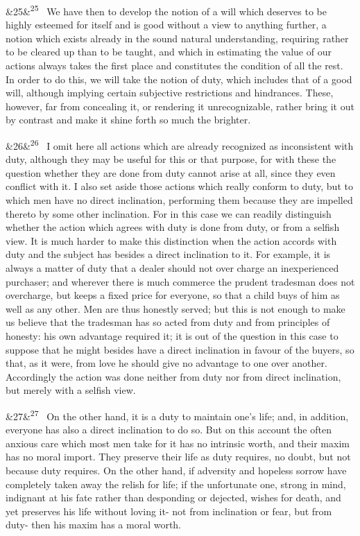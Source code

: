 \documentclass[12pt]{article}
\newcommand{\para}[1][]{\par\noindent\ifx&#1&\else\textsuperscript{\footnotesize #1}~\fi}
\begin{document}
\para[25] We have then to develop the notion of a will which deserves to be highly esteemed for itself and is good without a view to anything further, a notion which exists already in the sound natural understanding, requiring rather to be cleared up than to be taught, and which in estimating the value of our actions always takes the first place and constitutes the condition of all the rest. In order to do this, we will take the notion of duty, which includes that of a good will, although implying certain subjective restrictions and hindrances. These, however, far from concealing it, or rendering it unrecognizable, rather bring it out by contrast and make it shine forth so much the brighter.

\para[26] I omit here all actions which are already recognized as inconsistent with duty, although they may be useful for this or that purpose, for with these the question whether they are done from duty cannot arise at all, since they even conflict with it. I also set aside those actions which really conform to duty, but to which men have no direct inclination, performing them because they are impelled thereto by some other inclination. For in this case we can readily distinguish whether the action which agrees with duty is done from duty, or from a selfish view. It is much harder to make this distinction when the action accords with duty and the subject has besides a direct inclination to it. For example, it is always a matter of duty that a dealer should not over charge an inexperienced purchaser; and wherever there is much commerce the prudent tradesman does not overcharge, but keeps a fixed price for everyone, so that a child buys of him as well as any other. Men are thus honestly served; but this is not enough to make us believe that the tradesman has so acted from duty and from principles of honesty: his own advantage required it; it is out of the question in this case to suppose that he might besides have a direct inclination in favour of the buyers, so that, as it were, from love he should give no advantage to one over another. Accordingly the action was done neither from duty nor from direct inclination, but merely with a selfish view.

\para[27] On the other hand, it is a duty to maintain one's life; and, in addition, everyone has also a direct inclination to do so. But on this account the often anxious care which most men take for it has no intrinsic worth, and their maxim has no moral import. They preserve their life as duty requires, no doubt, but not because duty requires. On the other hand, if adversity and hopeless sorrow have completely taken away the relish for life; if the unfortunate one, strong in mind, indignant at his fate rather than desponding or dejected, wishes for death, and yet preserves his life without loving it- not from inclination or fear, but from duty- then his maxim has a moral worth.
\end{document}
